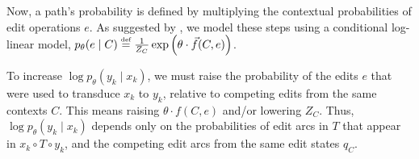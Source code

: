\documentclass[11pt,letterpaper]{article}
\newcommand{\defeq}{\stackrel{\mbox{\tiny def}}{=}}
\newcommand{\ptheta}{{p_\theta}}
\begin{document}
Now, a path's probability is defined by multiplying the contextual probabilities of edit operations $e$.  As suggested by
, we model these steps using a conditional log-linear model,
$\ptheta(e \mid C) \defeq \frac{1}{Z_C} \exp \left( \theta \cdot \vec{f}(C,e) \right)$.

To increase $\log \ptheta(y_k \mid x_k)$, we must raise the probability of the edits $e$ that were used to transduce $x_k$ to $y_k$, relative to competing edits from the same contexts $C$.  This means raising $\theta \cdot f(C,e)$ and/or lowering $Z_C$.  Thus, $\log \ptheta(y_k \mid x_k)$ depends only on the probabilities of edit arcs in $T$ that appear in $x_k \circ T \circ y_k$, and the competing edit arcs from the same edit states $q_C$.  


% 
\end{document}
